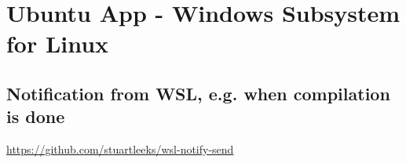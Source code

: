 \section{Ubuntu App - Windows Subsystem for Linux}





\newpage









\subsection{Notification from WSL, e.g. when compilation is done}

\url{https://github.com/stuartleeks/wsl-notify-send}